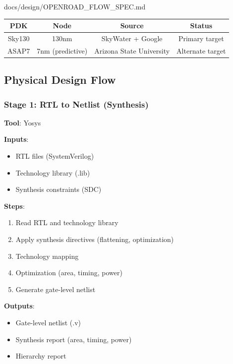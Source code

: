 \begin{relocated}{docs/design/OPENROAD_FLOW_SPEC.md}
{
\begin{longtable}[]{@{}cccc@{}}
\toprule\noalign{}
PDK & Node & Source & Status \\
\midrule\noalign{}
\endhead
\bottomrule\noalign{}
\endlastfoot
Sky130 & 130nm & SkyWater + Google & Primary target \\
ASAP7 & 7nm (predictive) & Arizona State University & Alternate
target \\
\end{longtable}
}

\subsection{Physical Design Flow}\label{tm:pd:openroad-flow:physical-design-flow}

\subsubsection{Stage 1: RTL to Netlist (Synthesis)}\label{tm:pd:openroad-flow:stage-1-rtl-to-netlist-synthesis}

\textbf{Tool}: Yosys

\textbf{Inputs}:

\begin{itemize}
\tightlist
\item
  RTL files (SystemVerilog)
\item
  Technology library (.lib)
\item
  Synthesis constraints (SDC)
\end{itemize}

\textbf{Steps}:

\begin{enumerate}
\def\labelenumi{\arabic{enumi}.}
\tightlist
\item
  Read RTL and technology library
\item
  Apply synthesis directives (flattening, optimization)
\item
  Technology mapping
\item
  Optimization (area, timing, power)
\item
  Generate gate-level netlist
\end{enumerate}

\textbf{Outputs}:

\begin{itemize}
\tightlist
\item
  Gate-level netlist (.v)
\item
  Synthesis report (area, timing, power)
\item
  Hierarchy report
\end{itemize}


\end{relocated}
